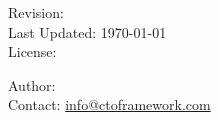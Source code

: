 \newpage %

\begin{flushleft}
    \textbf{\Large \booktitle}

    \vspace{1cm}

    Revision: \GitTag\\
    Last Updated: \today \\
    License: \booklicence

    \vspace{1cm}

    Author: \bookauthor\\
    Contact: \url{info@ctoframework.com}

\end{flushleft}